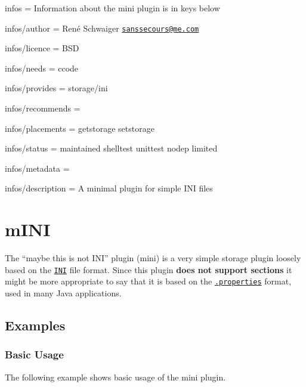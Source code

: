 
\begin{DoxyItemize}
\item infos = Information about the mini plugin is in keys below
\item infos/author = René Schwaiger \href{mailto:sanssecours@me.com}{\tt sanssecours@me.\+com}
\item infos/licence = B\+SD
\item infos/needs = ccode
\item infos/provides = storage/ini
\item infos/recommends =
\item infos/placements = getstorage setstorage
\item infos/status = maintained shelltest unittest nodep limited
\item infos/metadata =
\item infos/description = A minimal plugin for simple I\+NI files
\end{DoxyItemize}\hypertarget{autotoc_md404_src_plugins_mini_README_md}{}\section{m\+I\+NI}\label{autotoc_md404_src_plugins_mini_README_md}
The “maybe this is not I\+N\+I” plugin ({\ttfamily mini}) is a very simple storage plugin loosely based on the \href{https://en.wikipedia.org/wiki/INI_file}{\tt I\+NI} file format. Since this plugin {\bfseries does not support sections} it might be more appropriate to say that it is based on the \href{https://en.wikipedia.org/wiki/.properties}{\tt .properties} format, used in many Java applications.\hypertarget{autotoc_md404_autotoc_md405}{}\subsection{Examples}\label{autotoc_md404_autotoc_md405}
\hypertarget{autotoc_md404_autotoc_md406}{}\subsubsection{Basic Usage}\label{autotoc_md404_autotoc_md406}
The following example shows basic usage of the {\ttfamily mini} plugin.

